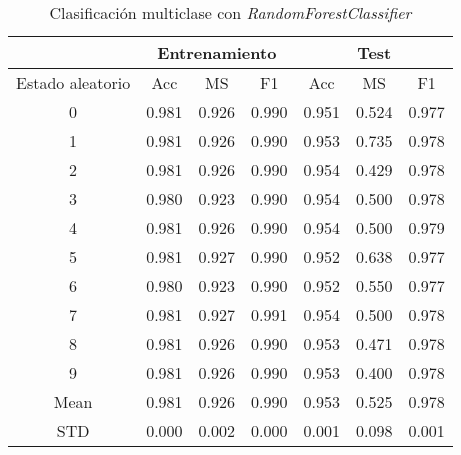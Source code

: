 \begin{table}[th]
	\centering
	\begin{tabular}{ |c|c|c|c|c|c|c| }
		\hline
		\rowcolor{LightCyan}
		 & \multicolumn{3}{c|}{Entrenamiento} & \multicolumn{3}{c|}{Test} \\
		\hline
		\rowcolor{LightCyan}
		 Estado aleatorio & Acc & MS & F1 & Acc & MS & F1 \\
		\hline
		0 & 0.981 & 0.926 & 0.990 & 0.951 & 0.524 & 0.977 \\
		1 & 0.981 & 0.926 & 0.990 & 0.953 & 0.735 & 0.978 \\
		2 & 0.981 & 0.926 & 0.990 & 0.954 & 0.429 & 0.978 \\
		3 & 0.980 & 0.923 & 0.990 & 0.954 & 0.500 & 0.978 \\
		4 & 0.981 & 0.926 & 0.990 & 0.954 & 0.500 & 0.979 \\
		5 & 0.981 & 0.927 & 0.990 & 0.952 & 0.638 & 0.977 \\
		6 & 0.980 & 0.923 & 0.990 & 0.952 & 0.550 & 0.977 \\
		7 & 0.981 & 0.927 & 0.991 & 0.954 & 0.500 & 0.978 \\
		8 & 0.981 & 0.926 & 0.990 & 0.953 & 0.471 & 0.978 \\
		9 & 0.981 & 0.926 & 0.990 & 0.953 & 0.400 & 0.978 \\
		Mean & 0.981 & 0.926 & 0.990 & 0.953 & 0.525 & 0.978 \\
		STD & 0.000 & 0.002 & 0.000 & 0.001 & 0.098 & 0.001 \\
		\hline
	\end{tabular}
	\caption{Clasificación multiclase con \textit{RandomForestClassifier}}
	\label{tabla:rf_multi}
\end{table}
